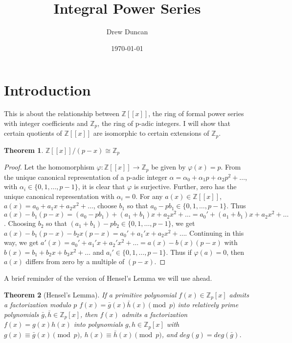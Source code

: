 \documentclass{article}
\title{Integral Power Series}
\author{Drew Duncan}
\date{\today}
\newtheorem{theorem}{Theorem}
\begin{document}
\maketitle

\section{Introduction}

This is about the relationship between $\mathbb{Z}[[x]]$, the ring of formal power series with integer coefficients and $\mathbb{Z}_p$, the ring of p-adic integers.  I will show that certain quotients of $\mathbb{Z}[[x]]$ are isomorphic to certain extensions of $\mathbb{Z}_p$.

\begin{theorem}\label{Z_p}
$\mathbb{Z}[[x]]/(p-x) \cong \mathbb{Z}_p$
\end{theorem}
\begin{proof}
Let the homomorphism $\varphi : \mathbb{Z}[[x]] \rightarrow \mathbb{Z}_p$ be given by $\varphi(x) = p$.  From the unique canonical representation of a p-adic integer $\alpha = \alpha_0 + \alpha_1 p  + \alpha_2 p^2 + \ldots$, with $\alpha_i \in \{0, 1, \ldots, p-1\}$, it is clear that $\varphi$ is surjective.  Further, zero has the unique canonical  representation with $\alpha_i = 0$.  For any $a(x) \in \mathbb{Z}[[x]]$, $a(x) = a_0 + a_1 x + a_2 x^2 + \ldots$, choose $b_1$ so that $a_0 - pb_1 \in \{0, 1, \ldots, p-1\}$.  Thus $a(x) - b_1(p-x) = (a_0 - pb_1) + (a_1 + b_1)x + a_2 x^2 + \ldots = a_0' + (a_1 + b_1)x + a_2 x^2 + \ldots$.  Choosing $b_2$ so that $(a_1 + b_1) - pb_2 \in \{0, 1, \ldots, p-1\}$, we get $a(x) - b_1(p-x) - b_2x(p-x) = a_0' + a_1'x + a_2 x^2 + \ldots$.  Continuing in this way, we get $a'(x)= a_0' + a_1'x + a_2' x^2 + \ldots = a(x) - b(x)(p-x)$ with $b(x) = b_1 + b_2x + b_3x^2 + \ldots$ and $a_i' \in \{0,1,\ldots,p-1\}$.  Thus if $\varphi(a) = 0$, then $a(x)$ differs from zero by a multiple of $(p-x)$.
\end{proof}

A brief reminder of the version of Hensel's Lemma we will use ahead.

\begin{theorem}[Hensel's Lemma]
If a primitive polynomial $f(x) \in \mathbb{Z}_p[x]$ admits a factorization modulo $p$ $f(x) = \bar{g}(x)\bar{h}(x) \pmod{p}$ into relatively prime polynomials $\bar{g},\bar{h} \in \mathbb{Z}_p[x]$, then $f(x)$ admits a factorization $f(x) = g(x)h(x)$ into polynomials $g,h \in \mathbb{Z}_p[x]$ with $g(x) \equiv \bar{g}(x) \pmod{p}$, $h(x) \equiv \bar{h}(x) \pmod{p}$, and $deg(g) = deg(\bar{g})$.

\end{theorem}
\end{document}

